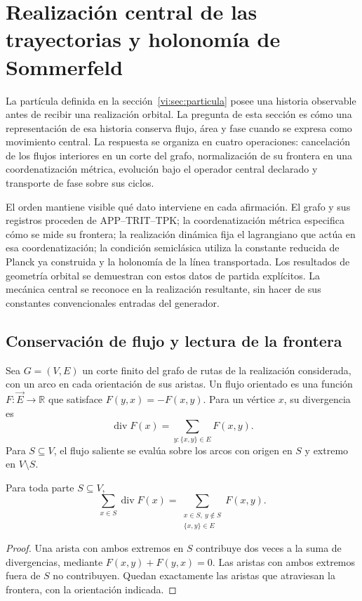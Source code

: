 \section{Realización central de las trayectorias y holonomía de Sommerfeld}
\label{vi:sec:kepler}

La partícula definida en la sección~\ref{vi:sec:particula} posee
una historia observable antes de recibir una realización orbital.
La pregunta de esta sección es cómo una representación de esa
historia conserva flujo, área y fase cuando se expresa como
movimiento central. La respuesta se organiza en cuatro operaciones:
cancelación de los flujos interiores en un corte del grafo,
normalización de su frontera en una coordenatización métrica, evolución bajo
el operador central declarado y transporte de fase sobre sus ciclos.

El orden mantiene visible qué dato interviene en cada afirmación.
El grafo y sus registros proceden de APP--TRIT--TPK; la coordenatización
métrica especifica cómo se mide su frontera; la realización dinámica
fija el lagrangiano que actúa en esa coordenatización; la condición semiclásica
utiliza la constante reducida de Planck ya construida y la holonomía
de la línea transportada. Los resultados de geometría orbital se
demuestran con estos datos de partida explícitos. La mecánica
central se reconoce en la realización resultante, sin hacer de sus
constantes convencionales entradas del generador.

\subsection{Conservación de flujo y lectura de la frontera}
\label{vi:subsec:gauss}

Sea $G=(V,E)$ un corte finito del grafo de rutas de la
realización considerada, con un arco en cada orientación de sus
aristas. Un flujo orientado es una función
$F:\vec E\to\mathbb R$ que satisface
$F(y,x)=-F(x,y)$. Para un vértice $x$, su divergencia es
\begin{equation}
 \operatorname{div}F(x)
 =\sum_{y:\{x,y\}\in E}F(x,y).
 \label{vi:eq:divergencia-grafo}
\end{equation}
Para $S\subseteq V$, el flujo saliente se evalúa sobre los
arcos con origen en $S$ y extremo en $V\setminus S$.

\begin{theorem}
\label{vi:thm:gauss}
Para toda parte $S\subseteq V$,
\begin{equation}
 \sum_{x\in S}\operatorname{div}F(x)
 =\sum_{\substack{x\in S,\ y\notin S\\\{x,y\}\in E}}F(x,y).
 \label{vi:eq:gauss}
\end{equation}
\end{theorem}
\begin{proof}
Una arista con ambos extremos en $S$ contribuye dos veces a la
suma de divergencias, mediante $F(x,y)+F(y,x)=0$. Las aristas
con ambos extremos fuera de $S$ no contribuyen. Quedan
exactamente las aristas que atraviesan la frontera, con la
orientación indicada.
\end{proof}

